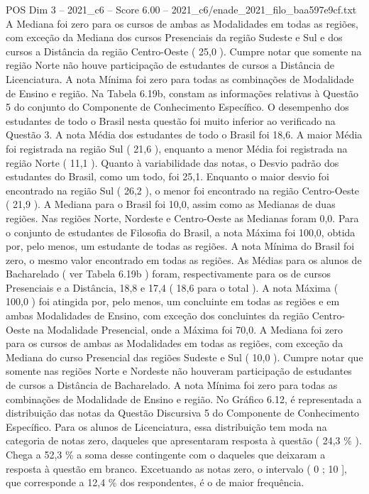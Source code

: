 \begin{textsample}{POS Dim 3 – 2021\_c6 – Score 6.00 – 2021\_c6/enade\_2021\_filo\_baa597e9cf.txt}
A Mediana foi zero para os cursos de ambas as Modalidades em todas as regiões, com exceção da Mediana dos cursos Presenciais da região Sudeste e Sul e dos cursos a Distância da região Centro-Oeste ( 25,0 ).
Cumpre notar que somente na região Norte não houve participação de estudantes de cursos a Distância de Licenciatura.
A nota Mínima foi zero para todas as combinações de Modalidade de Ensino e região.
Na Tabela 6.19b, constam as informações relativas à Questão 5 do conjunto do Componente de Conhecimento Específico.
O desempenho dos estudantes de todo o Brasil nesta questão foi muito inferior ao verificado na Questão 3.
A nota Média dos estudantes de todo o Brasil foi 18,6.
A maior Média foi registrada na região Sul ( 21,6 ), enquanto a menor Média foi registrada na região Norte ( 11,1 ).
Quanto à variabilidade das notas, o Desvio padrão dos estudantes do Brasil, como um todo, foi 25,1.
Enquanto o maior desvio foi encontrado na região Sul ( 26,2 ), o menor foi encontrado na região Centro-Oeste ( 21,9 ).
A Mediana para o Brasil foi 10,0, assim como as Medianas de duas regiões.
Nas regiões Norte, Nordeste e Centro-Oeste as Medianas foram 0,0.
Para o conjunto de estudantes de Filosofia do Brasil, a nota Máxima foi 100,0, obtida por, pelo menos, um estudante de todas as regiões.
A nota Mínima do Brasil foi zero, o mesmo valor encontrado em todas as regiões.
As Médias para os alunos de Bacharelado ( ver Tabela 6.19b ) foram, respectivamente para os de cursos Presenciais e a Distância, 18,8 e 17,4 ( 18,6 para o total ).
A nota Máxima ( 100,0 ) foi atingida por, pelo menos, um concluinte em todas as regiões e em ambas Modalidades de Ensino, com exceção dos concluintes da região Centro-Oeste na Modalidade Presencial, onde a Máxima foi 70,0.
A Mediana foi zero para os cursos de ambas as Modalidades em todas as regiões, com exceção da Mediana do curso Presencial das regiões Sudeste e Sul ( 10,0 ).
Cumpre notar que somente nas regiões Norte e Nordeste não houveram participação de estudantes de cursos a Distância de Bacharelado.
A nota Mínima foi zero para todas as combinações de Modalidade de Ensino e região.
No Gráfico 6.12, é representada a distribuição das notas da Questão Discursiva 5 do Componente de Conhecimento Específico.
Para os alunos de Licenciatura, essa distribuição tem moda na categoria de notas zero, daqueles que apresentaram resposta à questão ( 24,3 \% ).
Chega a 52,3 \% a soma desse contingente com o daqueles que deixaram a resposta à questão em branco.
Excetuando as notas zero, o intervalo ( 0 ; 10 ], que corresponde a 12,4 \% dos respondentes, é o de maior frequência.

\end{textsample}
